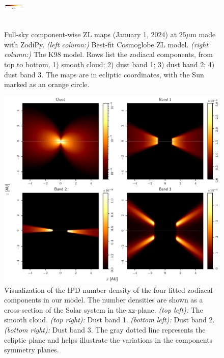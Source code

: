 \documentclass[twocolumn]{aa}
\begin{document}
\begin{figure}
{    \includegraphics[width=1cm,angle=90]{figs/comp_maps/cbar_2_inst.pdf}%
    }\\
    \\
    \caption{Full-sky component-wise ZL maps (January 1, 2024) at $25\mu$m made with ZodiPy. 
    \textit{(left column:)} Best-fit Cosmoglobe ZL model. \textit{(right column:)} The K98 model.
    Rows list the zodiacal components, from top to bottom, 1) smooth cloud; 2) dust band 1; 3) 
    dust band 2; 4) dust band 3. The maps are in ecliptic coordinates, with the Sun marked as 
    an orange circle.}
    \label{fig:mission-averaged-inst-maps}
\end{figure}

\begin{figure}
    \centering
    \includegraphics[width=\textwidth]{figs/number_density.pdf}
    \caption{Visualization of the IPD number density of the four fitted zodiacal components in our model. The number densities are shown as a cross-section of the Solar system in the xz-plane. \textit{(top left):} The smooth cloud. \textit{(top right):} Dust band 1. \textit{(bottom left):} Dust band 2. \textit{(bottom right):} Dust band 3. The gray dotted line represents the ecliptic plane and helps illustrate the variations in the components symmetry planes.}
    \label{fig:ipd-number-density}
\end{figure}
\end{document}

